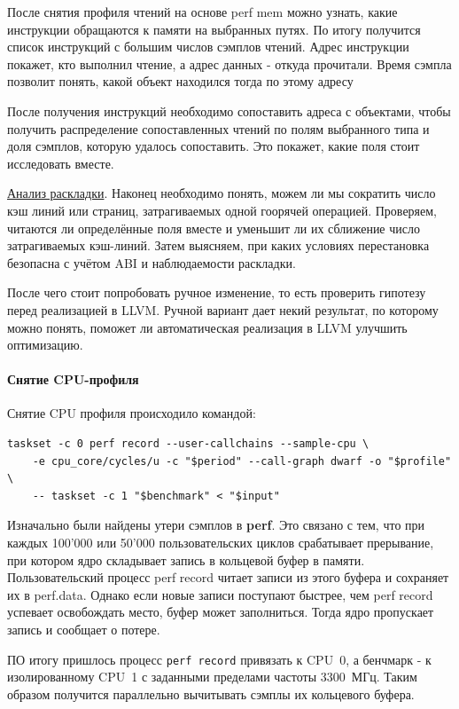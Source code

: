 \documentclass[a4paper,12pt]{article}
\begin{document}
После снятия профиля чтений на основе perf mem можно узнать, какие инструкции
обращаются к памяти на выбранных путях. По итогу получится список инструкций с
большим числов сэмплов чтений. Адрес инструкции покажет, кто выполнил чтение, а
адрес данных - откуда прочитали. Время сэмпла позволит понять, какой объект
находился тогда по этому адресу

После получения инструкций необходимо сопоставить адреса с объектами, чтобы
получить распределение сопоставленных чтений по полям выбранного типа и доля
сэмплов, которую удалось сопоставить. Это покажет, какие поля стоит исследовать
вместе.

\underline{Анализ раскладки}. Наконец необходимо понять, можем ли мы сократить
число кэш линий или страниц, затрагиваемых одной гоорячей операцией.
Проверяем, читаются ли определённые поля вместе и уменьшит ли их сближение число 
затрагиваемых кэш-линий. Затем выясняем, при каких условиях перестановка безопасна с 
учётом ABI и наблюдаемости раскладки.

После чего стоит попробовать ручное изменение, то есть проверить гипотезу перед
реализацией в LLVM. Ручной вариант дает некий результат, по которому можно
понять, поможет ли автоматическая реализация в LLVM улучшить оптимизацию.

\paragraph{Снятие CPU-профиля}

Снятие CPU профиля происходило командой:
\begin{lstlisting}
taskset -c 0 perf record --user-callchains --sample-cpu \
    -e cpu_core/cycles/u -c "$period" --call-graph dwarf -o "$profile" \
    -- taskset -c 1 "$benchmark" < "$input"
\end{lstlisting}

Изначально были найдены утери сэмплов в \textbf{perf}. Это связано с тем, что при 
каждых 100'000 или 50'000 пользовательских циклов срабатывает прерывание, при
котором ядро складывает запись в кольцевой буфер в памяти. Пользовательский
процесс perf record читает записи из этого буфера и сохраняет их в perf.data.
Однако если новые записи поступают быстрее, чем perf record успевает освобождать
место, буфер может заполниться. Тогда ядро пропускает запись и сообщает о
потере.

ПО итогу пришлось процесс \texttt{perf record} привязать к CPU~0, а бенчмарк - к
изолированному CPU~1 с заданными пределами частоты 3300~МГц. Таким образом
получится параллельно вычитывать сэмплы их кольцевого буфера.
\end{document}
